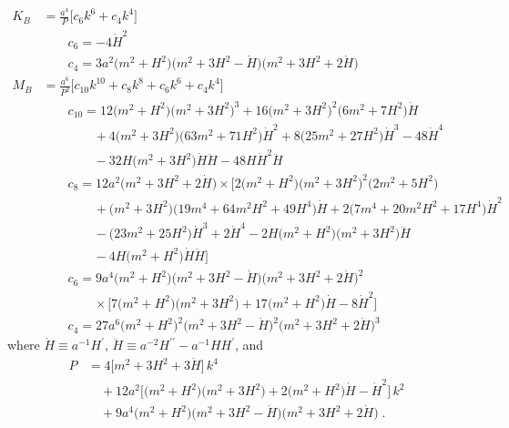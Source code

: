 \documentclass[11pt,a4paper]{article}
\newcommand{\bes}[1]{\begin{equation}\begin{split} #1 \end{split}\end{equation}}
\newcommand{\bsa}[2]{\begin{subequations}\label{#1}\begin{align} #2 \end{align}\end{subequations}}
\begin{document}
\bsa{eq:model2_KB_MB_def}{
    K_B & = \tfrac{a^4}{P} \big[ c_6 k^6 + c_4 k^4 \big] \\
    & \qquad c_6 = -4 \dot{H}^2 \nonumber \\
    & \qquad c_4 = 3 a^2 \bigl( m^2 + H^2 \bigr) \bigl( m^2 + 3 H^2 - \dot{H} \bigr) \bigl( m^2 + 3 H^2 + 2 \dot{H} \bigr) \nonumber \\
    M_B & = \tfrac{a^6}{P^2} \big[ c_{10} k^{10} + c_8 k^8 + c_6 k^6 + c_4 k^4 \big] \\
    & \qquad c_{10} = 
    12 \bigl( m^2 + H^2 \bigr) \bigl( m^2 + 3 H^2 \bigr)^3 
    + 16 \bigl( m^2 + 3 H^2 \bigr)^2 \bigl( 6 m^2 + 7 H^2 \bigr) \dot{H} 
    \nonumber \\ & \qquad \qquad 
    + 4 \bigl( m^2 + 3 H^2 \bigr) \bigl( 63 m^2 + 71 H^2 \bigr) \dot{H}^2 
    + 8 \bigl( 25 m^2 + 27 H^2 \bigr) \dot{H}^3 
    - 48 \dot{H}^4 
    \nonumber \\ & \qquad \qquad 
    - 32 H \bigl( m^2 + 3 H^2 \bigr) \dot{H} \ddot{H} 
    - 48 H \dot{H}^2 \ddot{H}
    \nonumber \\
    & \qquad c_{8} = 12 a^2 \bigl( m^2 + 3 H^2 + 2 \dot{H} \bigr) 
    \times \bigl[ 2 \bigl( m^2 + H^2 \bigr) \bigl( m^2 + 3 H^2 \bigr)^2 \bigl( 2 m^2 + 5 H^2 \bigr) 
    \nonumber \\ & \qquad \qquad 
    + \bigl( m^2 + 3 H^2 \bigr) \bigl( 19 m^4 + 64 m^2 H^2 + 49 H^4 \bigr) \dot{H} 
    + 2 \bigl( 7 m^4 + 20 m^2 H^2 + 17 H^4 \bigr) \dot{H}^2 
    \nonumber \\ & \qquad \qquad 
    - \bigl( 23 m^2 + 25 H^2 \bigr) \dot{H}^3
    + 2 \dot{H}^4
    - 2 H \bigl( m^2 + H^2 \bigr) \bigl( m^2 + 3 H^2 \bigr) \ddot{H}
    \nonumber \\ & \qquad \qquad 
    - 4 H \bigl( m^2 + H^2 \bigr) \dot{H} \ddot{H} 
    \bigr] \nonumber \\
    & \qquad c_{6} = 9 a^4 \bigl( m^2 + H^2 \bigr) \bigl( m^2 + 3 H^2 - \dot{H} \bigr) \bigl( m^2 + 3 H^2 + 2 \dot{H} \bigr)^2 
    \nonumber \\ & \qquad \qquad 
    \times \bigl[ 7 \bigl( m^2 + H^2 \bigr) \bigl( m^2 + 3 H^2 \bigr) + 17 \bigl( m^2 + H^2 \bigr) \dot{H} - 8 \dot{H}^2 \bigr] \nonumber \\
    & \qquad c_{4} = 27 a^6 \bigl( m^2 + H^2 \bigr)^2 \bigl(  m^2 + 3 H^2 - \dot{H} \bigr)^2 \bigl( m^2 + 3 H^2 + 2 \dot{H} \bigr)^3 \nonumber 
}
where $\dot{H} \equiv a^{-1} H^\prime$, $\ddot{H} \equiv a^{-2} H^{\prime\prime} - a^{-1} H H^\prime$, and 
\bes{
    P & = 
    4 \bigl[ m^2 + 3 H^2 + 3 \dot{H} \bigr] \, k^4 
    \\ & \quad 
    + 12 a^2 \bigl[ \bigl( m^2 + H^2 \bigr) \bigl( m^2 + 3 H^2 \bigr) + 2 \bigl( m^2 + H^2 \bigr) \dot{H} - \dot{H}^2 \bigr] \, k^2
    \\ & \quad 
    +9 a^4 \bigl( m^2 + H^2 \bigr) \bigl( m^2 + 3 H^2 - \dot{H} \bigr) \bigl( m^2 + 3 H^2 + 2 \dot{H} \bigr)
    \;.
}
\end{document}
